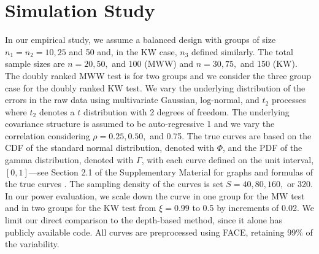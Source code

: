 \documentclass[12pt]{article}
\theoremstyle{plain}
\begin{document}


	\section{Simulation Study}
	\label{s:sim}
	
	In our empirical study, we assume a balanced design with groups of size $n_1 = n_2 = 10, 25$ and 50 and, in the KW case, $n_3$ defined similarly. The total sample sizes are $n = 20, 50,$ and 100 (MWW) and $n = 30, 75,$ and 150 (KW). The doubly ranked MWW test is for two groups and we consider the three group case for the doubly ranked KW test. We vary the underlying distribution of the errors in the raw data using multivariate Gaussian, log-normal, and $t_2$ processes where $t_2$ denotes a $t$ distribution with 2 degrees of freedom. The underlying covariance structure is assumed to be auto-regressive 1 and we vary the correlation considering $\rho = 0.25, 0.50,$ and 0.75. The true curves are based on the CDF of the standard normal distribution, denoted with $\Phi$, and the PDF of the gamma distribution, denoted with $\Gamma$, with each curve defined on the unit interval, $[0,1]$---see Section 2.1 of the Supplementary Material for graphs and formulas of the true curves \citep{DRTSup2023}. The sampling density of the curves is set $S = 40, 80, 160,$ or 320. In our power evaluation, we scale down the curve in one group for the MW test and in two groups for the KW test from $\xi = 0.99$ to 0.5 by increments of 0.02. We limit our direct comparison to the depth-based method, since it alone has publicly available code. All curves are preprocessed using FACE, retaining 99\% of the variability.
	
		
\end{document}
